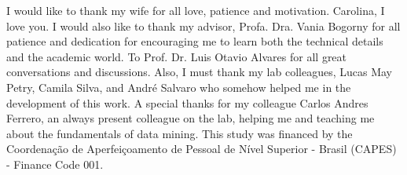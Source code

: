 
\begin{agradecimentos}

\lang
{
    I would like to thank my wife for all love, patience and motivation. Carolina, I love you.
    I would also like to thank my advisor, Profa. Dra. Vania Bogorny for all patience and dedication for encouraging me to learn both the technical details and the academic world. To Prof. Dr. Luis Otavio Alvares for all great conversations and discussions.
    Also, I must thank my lab colleagues, Lucas May Petry, Camila Silva, and André Salvaro who somehow helped me in the development of this work. A special thanks for my colleague Carlos Andres Ferrero, an always present colleague on the lab, helping me and teaching me about the fundamentals of data mining.
    This study was financed by the Coordenação de Aperfeiçoamento de Pessoal de Nível Superior - Brasil (CAPES) - Finance Code 001.
}
{
    
}

\end{agradecimentos}


%
%
%
